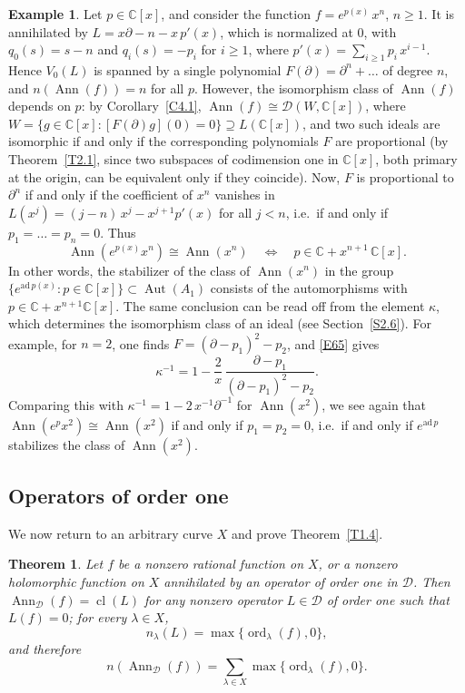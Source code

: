 \documentclass[11pt,reqno]{amsart}
\theoremstyle{plain}
\newtheorem{theorem}{Theorem}[section]
\theoremstyle{definition}
\newtheorem{example}{Example}[section]
\theoremstyle{remark}
\numberwithin{equation}{section}
\newcommand{\cD}{\mathcal{D}}
\newcommand{\C}{\mathbb{C}}
\newcommand{\del}{\partial}
\DeclareMathOperator{\Ann}{Ann}
\DeclareMathOperator{\cl}{cl}
\DeclareMathOperator{\Aut}{Aut}
\DeclareMathOperator{\ord}{ord}
\begin{document}
\begin{example}
\label{Ex6.6}
Let $p \in \C[x]$, and consider the function $f = e^{p(x)}\, x^n$, $n \ge 1$. It is annihilated by
$L = x \del - n - x\, p'(x)$, which is normalized at $0$, with $q_0(s) = s - n$ and $q_i(s) = -
p_{i}$ for $i \ge 1$, where $p'(x) = \sum_{i \ge 1} p_i\, x^{i-1}$. Hence $V_0(L)$ is spanned by a
single polynomial $F(\del) = \del^n + \ldots$ of degree $n$, and $n(\Ann(f)) = n$ for all $p$.
However, the isomorphism class of $\Ann(f)$ depends on $p$: by Corollary~\ref{C4.1}, $\Ann(f)
\cong \cD(W, \C[x])$, where $W = \{ g \in \C[x] : [F(\del) g](0) = 0\} \supseteq L(\C[x])$, and
two such ideals are isomorphic if and only if the corresponding polynomials $F$ are proportional
(by Theorem~\ref{T2.1}, since two subspaces of codimension one in $\C[x]$, both primary at the
origin, can be equivalent only if they coincide). Now, $F$ is proportional to $\del^n$ if and only if the coefficient of
$x^n$ vanishes in $L(x^j) = (j - n)\, x^j - x^{j+1} p'(x)$ for all $j < n$, i.e.\ if and only if
$p_1 = \ldots = p_n = 0$. Thus
\[
  \Ann(e^{p(x)} x^n) \cong \Ann(x^n) \quad \Longleftrightarrow \quad p \in \C + x^{n+1}\, \C[x] .
\]
In other words, the stabilizer of the class of $\Ann(x^n)$ in the group $\{e^{\mathrm{ad}\, p(x)}
: p \in \C[x]\} \subset \Aut(A_1)$ consists of the automorphisms with $p \in \C + x^{n+1} \C[x]$.
The same conclusion can be read off from the element $\kappa$, which determines the
isomorphism class of an ideal (see Section~\ref{S2.6}). For example, for $n = 2$, one finds
$F = (\del - p_1)^2 - p_2$, and \eqref{E65} gives
\[
  \kappa^{-1} = 1 - \frac{2}{x}\, \frac{\del - p_1}{(\del - p_1)^2 - p_2} .
\]
Comparing this with $\kappa^{-1} = 1 - 2\, x^{-1} \del^{-1}$ for $\Ann(x^2)$,
we see again that $\Ann(e^{p} x^2) \cong \Ann(x^2)$ if and only if $p_1 = p_2 = 0$, i.e.\ if and
only if $e^{\mathrm{ad}\, p}$ stabilizes the class of $\Ann(x^2)$.
\end{example}

\subsection{Operators of order one}
\label{S6.2}
We now return to an arbitrary curve $X$ and prove Theorem~\ref{T1.4}.

\begin{theorem}
\label{T6.1}
Let $f$ be a nonzero rational function on $X$, or a nonzero holomorphic function on $X$
annihilated by an operator of order one in $\cD$. Then $\Ann_{\cD}(f) = \cl(L)$ for any nonzero
operator $L \in \cD$ of order one such that $L(f) = 0$; for every $\lambda \in X$,
\[
  n_\lambda(L) = \max\{\ord_\lambda(f), 0\} ,
\]
and therefore
\[
  n(\Ann_{\cD}(f)) = \sum_{\lambda \in X} \max\{\ord_\lambda(f), 0\} .
\]
\end{theorem}
\end{document}
